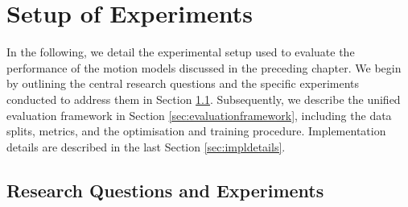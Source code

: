 \chapter{Setup of Experiments}
\label{chap:experimentalsetup}
\acresetall %
In the following, we detail the experimental setup used to evaluate the performance of the motion models discussed in the preceding chapter. We begin by outlining the central research questions and the specific experiments conducted to address them in Section \ref{sec:rqand}. Subsequently, we describe the unified evaluation framework in Section \ref{sec:evaluationframework}, including the data splits, metrics, and the optimisation and training procedure. Implementation details are described in the last Section \ref{sec:impldetails}.

\section{Research Questions and Experiments}
    \label{sec:rqand}

